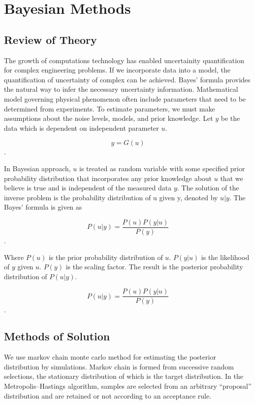 \chapter{Bayesian Methods}
\section{Review of Theory}

The growth of computations technology has enabled uncertainity quantification for complex engineering problems. If we  incorporate data into a model, the quantification of uncertainty of complex can be achieved. Bayes' formula provides the natural way to infer the necessary uncertainty information. Mathematical model governing physical phenomenon often include parameters that need to be determined from experiments. To estimate parameters, we must make assumptions about the noise levels, models, and prior knowledge. Let $y$ be the data which is dependent on independent parameter $u$. 

$$y = G(u)$$. 

\noindent  In Bayesian approach, $u$ is treated as random variable with some specified prior probability distribution that incorporates any prior knowledge about $u$ that we believe is true and is independent of the measured data $y$. The solution of the inverse problem is the probability distribution of u given y, denoted by $u|y$. The Bayes' formula is given as 

$$P(u|y) = \frac{P(u) P(y|u)}{P(y)}$$ .
 
 \bigskip
 
\noindent Where $P(u)$ is the prior probability distribution of $u$. $P(y|u)$ is the likelihood of $y$ given $u$. $P(y)$ is the scaling factor. 
 \noindent The result is the posterior probability distribution of $P(u|y)$.
 
$$P(u|y) = \frac{P(u) P(y|u)}{P(y)}$$ .

\section{Methods of Solution}

\noindent We use markov chain monte carlo method for estimating the posterior distribution by simulations. Markov chain is formed from successive random selections, the stationary distribution of which is the target distribution. In the Metropolis–Hastings algorithm, samples are selected from an arbitrary “proposal” distribution and are retained or not according to an acceptance rule. 



